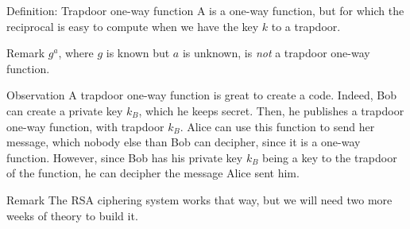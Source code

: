 \documentclass[a4paper]{article}
\begin{document}
\begin{parag}{Definition: Trapdoor one-way function}
    A  is a one-way function, but for which the reciprocal is easy to compute when we have the key $k$ to a trapdoor.

    \begin{subparag}{Remark}
        $g^a$, where $g$ is known but $a$ is unknown, is \textit{not} a trapdoor one-way function.
    \end{subparag}
\end{parag}

\begin{parag}{Observation}
    A trapdoor one-way function is great to create a code. Indeed, Bob can create a private key $k_B$, which he keeps secret. Then, he publishes a trapdoor one-way function, with trapdoor $k_B$. Alice can use this function to send her message, which nobody else than Bob can decipher, since it is a one-way function. However, since Bob has his private key $k_B$ being a key to the trapdoor of the function, he can decipher the message Alice sent him.


    \begin{subparag}{Remark}
        The RSA ciphering system works that way, but we will need two more weeks of theory to build it.
    \end{subparag}
\end{parag}
\end{document}
